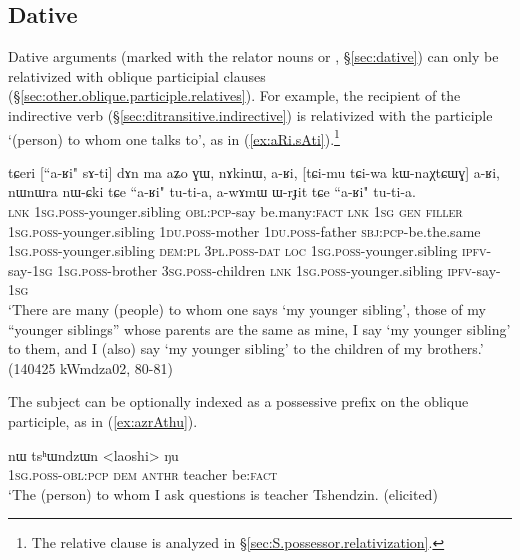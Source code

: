 \subsection{Dative} \label{sec:dative.relativization}
Dative arguments (marked with the relator nouns  or , §\ref{sec:dative}) can only be relativized with oblique participial clauses (§\ref{sec:other.oblique.participle.relatives}). For example, the recipient of the indirective verb  (§\ref{sec:ditransitive.indirective}) is relativized with the participle  `(person) to whom one talks to', as in (\ref{ex:aRi.sAti}).\footnote{The relative clause  is analyzed in §\ref{sec:S.possessor.relativization}.}

\begin{exe}
\ex \label{ex:aRi.sAti}
\gll tɕeri [``a-ʁi" sɤ-ti] dɤn ma aʑo ɣɯ, nɤkinɯ, a-ʁi, [tɕi-mu tɕi-wa kɯ-naχtɕɯɣ] a-ʁi, 
nɯnɯra nɯ-ɕki tɕe ``a-ʁi" tu-ti-a, a-wɤmɯ ɯ-rɟit tɕe ``a-ʁi" tu-ti-a. \\
\textsc{lnk} \textsc{1sg}.\textsc{poss}-younger.sibling \textsc{obl}:\textsc{pcp}-say be.many:\textsc{fact} \textsc{lnk} \textsc{1sg} \textsc{gen} \textsc{filler} \textsc{1sg}.\textsc{poss}-younger.sibling  \textsc{1du}.\textsc{poss}-mother  \textsc{1du}.\textsc{poss}-father \textsc{sbj}:\textsc{pcp}-be.the.same  \textsc{1sg}.\textsc{poss}-younger.sibling \textsc{dem}:\textsc{pl} \textsc{3pl}.\textsc{poss}-\textsc{dat} \textsc{loc}  \textsc{1sg}.\textsc{poss}-younger.sibling \textsc{ipfv}-say-\textsc{1sg} \textsc{1sg}.\textsc{poss}-brother \textsc{3sg}.\textsc{poss}-children \textsc{lnk} \textsc{1sg}.\textsc{poss}-younger.sibling \textsc{ipfv}-say-\textsc{1sg}  \\
\glt `There are many (people) to whom one says `my younger sibling', those of my ``younger siblings'' whose parents are the same as mine, I say `my younger sibling' to them, and I (also) say  `my younger sibling' to the children of my brothers.' (140425 kWmdza02, 80-81)
\end{exe}

The subject can be optionally indexed as a possessive prefix on the oblique participle, as in (\ref{ex:azrAthu}).

\begin{exe}
\ex \label{ex:azrAthu}
\gll [a-z-rɤ-tʰu] nɯ tsʰɯndzɯn <laoshi> ŋu \\
\textsc{1sg}.\textsc{poss}-\textsc{obl}:\textsc{pcp} \textsc{dem}  \textsc{anthr} teacher be:\textsc{fact} \\
\glt `The (person) to whom I ask questions is teacher Tshendzin. (elicited)
\end{exe}


